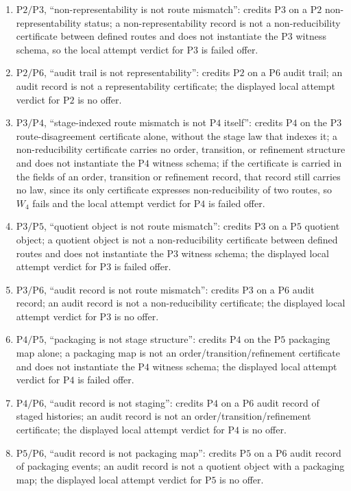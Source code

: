 \documentclass[11pt]{article}
\theoremstyle{definition}
\newcommand{\Ptwo}{\ensuremath{\mathrm{P2}}}
\newcommand{\Pthree}{\ensuremath{\mathrm{P3}}}
\newcommand{\Pfour}{\ensuremath{\mathrm{P4}}}
\newcommand{\Pfive}{\ensuremath{\mathrm{P5}}}
\newcommand{\Psix}{\ensuremath{\mathrm{P6}}}
\begin{document}
\begin{enumerate}[topsep=2pt,itemsep=2pt,label=\textup{(\arabic*)}]
    credits \Ptwo{} on \Pfour{} stage content; a representability certificate
    with realization relation is required, and stage variation supplies none, so
    the local attempt verdict for \Ptwo{} is no offer.
  \item \(\Ptwo{}/\Pthree{}\), ``non-representability is not route mismatch'':
    credits \Pthree{} on a \Ptwo{} non-representability status; a
    non-representability record is not a non-reducibility certificate between
    defined routes and does not instantiate the \Pthree{} witness schema, so the
    local attempt verdict for \Pthree{} is failed offer.
  \item \(\Ptwo{}/\Psix{}\), ``audit trail is not representability'': credits
    \Ptwo{} on a \Psix{} audit trail; an audit record is not a representability
    certificate; the displayed local attempt verdict for \Ptwo{} is no offer.
  \item \(\Pthree{}/\Pfour{}\), ``stage-indexed route mismatch is not \Pfour{}
    itself'': credits \Pfour{} on the \Pthree{} route-disagreement certificate
    alone, without the stage law that indexes it; a non-reducibility
    certificate carries no order, transition, or
    refinement structure and does not instantiate the \Pfour{} witness schema;
    if the certificate is carried in the fields of an order, transition or
    refinement record, that record still carries no law, since its only
    certificate expresses non-reducibility of two routes, so \(W_4\) fails and
    the local attempt verdict for \Pfour{} is failed offer.
  \item \(\Pthree{}/\Pfive{}\), ``quotient object is not route mismatch'':
    credits \Pthree{} on a \Pfive{} quotient object; a quotient object is not a
    non-reducibility certificate between defined routes and does not instantiate
    the \Pthree{} witness schema; the displayed local attempt verdict for \Pthree{} is
    failed offer.
  \item \(\Pthree{}/\Psix{}\), ``audit record is not route mismatch'': credits
    \Pthree{} on a \Psix{} audit record; an audit record is not a
    non-reducibility certificate; the displayed local attempt verdict for \Pthree{} is
    no offer.
  \item \(\Pfour{}/\Pfive{}\), ``packaging is not stage structure'': credits
    \Pfour{} on the \Pfive{} packaging map alone; a packaging map is not an
    order/transition/refinement certificate and does not instantiate the
    \Pfour{} witness schema; the displayed local attempt verdict for \Pfour{} is failed offer.
  \item \(\Pfour{}/\Psix{}\), ``audit record is not staging'': credits \Pfour{}
    on a \Psix{} audit record of staged histories; an audit record is not an
    order/transition/refinement certificate; the displayed local attempt verdict for \Pfour{} is
    no offer.
  \item \(\Pfive{}/\Psix{}\), ``audit record is not packaging map'': credits
    \Pfive{} on a \Psix{} audit record of packaging events; an audit record is
    not a quotient object with a packaging map; the displayed local attempt verdict for \Pfive{} is
    no offer.
\end{enumerate}
\end{document}
